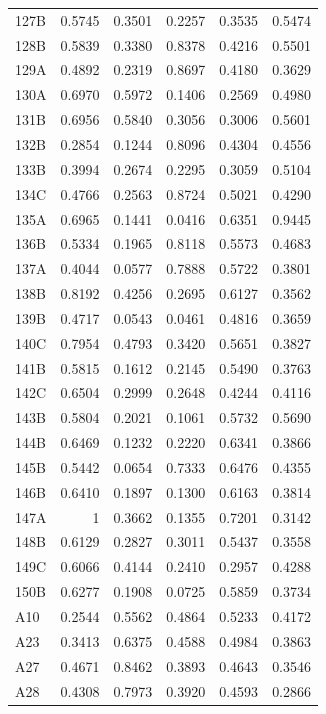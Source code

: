 \begin{longtable}{lrrrrr}
  127B & 0.5745 & 0.3501 & 0.2257 & 0.3535 & 0.5474 \\
  128B & 0.5839 & 0.3380 & 0.8378 & 0.4216 & 0.5501 \\
  129A & 0.4892 & 0.2319 & 0.8697 & 0.4180 & 0.3629 \\
  130A & 0.6970 & 0.5972 & 0.1406 & 0.2569 & 0.4980 \\
  131B & 0.6956 & 0.5840 & 0.3056 & 0.3006 & 0.5601 \\
  132B & 0.2854 & 0.1244 & 0.8096 & 0.4304 & 0.4556 \\
  133B & 0.3994 & 0.2674 & 0.2295 & 0.3059 & 0.5104 \\
  134C & 0.4766 & 0.2563 & 0.8724 & 0.5021 & 0.4290 \\
  135A & 0.6965 & 0.1441 & 0.0416 & 0.6351 & 0.9445 \\
  136B & 0.5334 & 0.1965 & 0.8118 & 0.5573 & 0.4683 \\
  137A & 0.4044 & 0.0577 & 0.7888 & 0.5722 & 0.3801 \\
  138B & 0.8192 & 0.4256 & 0.2695 & 0.6127 & 0.3562 \\
  139B & 0.4717 & 0.0543 & 0.0461 & 0.4816 & 0.3659 \\
  140C & 0.7954 & 0.4793 & 0.3420 & 0.5651 & 0.3827 \\
  141B & 0.5815 & 0.1612 & 0.2145 & 0.5490 & 0.3763 \\
  142C & 0.6504 & 0.2999 & 0.2648 & 0.4244 & 0.4116 \\
  143B & 0.5804 & 0.2021 & 0.1061 & 0.5732 & 0.5690 \\
  144B & 0.6469 & 0.1232 & 0.2220 & 0.6341 & 0.3866 \\
  145B & 0.5442 & 0.0654 & 0.7333 & 0.6476 & 0.4355 \\
  146B & 0.6410 & 0.1897 & 0.1300 & 0.6163 & 0.3814 \\
  147A & 1 & 0.3662 & 0.1355 & 0.7201 & 0.3142 \\
  148B & 0.6129 & 0.2827 & 0.3011 & 0.5437 & 0.3558 \\
  149C & 0.6066 & 0.4144 & 0.2410 & 0.2957 & 0.4288 \\
  150B & 0.6277 & 0.1908 & 0.0725 & 0.5859 & 0.3734 \\
  A10 & 0.2544 & 0.5562 & 0.4864 & 0.5233 & 0.4172 \\
  A23 & 0.3413 & 0.6375 & 0.4588 & 0.4984 & 0.3863 \\
  A27 & 0.4671 & 0.8462 & 0.3893 & 0.4643 & 0.3546 \\
  A28 & 0.4308 & 0.7973 & 0.3920 & 0.4593 & 0.2866 \\

\end{longtable}
